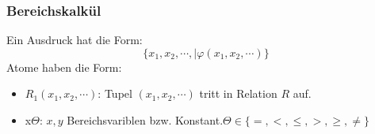 \subsubsection{Bereichskalk\"ul}
\begin{definition}
    Ein Ausdruck hat die Form:
    \[\{x_1,x_2,\cdots,\mid \varphi(x_1,x_2,\cdots)\}\]
    Atome haben die Form:\begin{itemize}
        \item \(R_1(x_1,x_2,\cdots)\): Tupel \((x_1,x_2,\cdots)\) tritt in Relation \(R\) auf.
        \item x\(\Theta\): \(x,y\) Bereichsvariblen bzw. Konstant.\(\Theta \in \{=,<,\leq,>,\geq,\not =\}\)
    \end{itemize}
\end{definition}